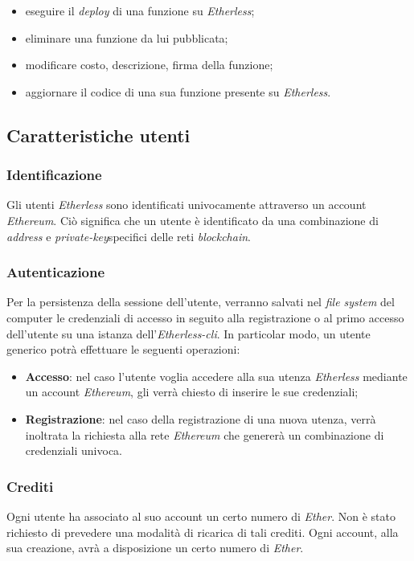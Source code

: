 \begin{itemize}
	\item eseguire il \textit{deploy\glo} di una funzione su \textit{Etherless};
	\item eliminare una funzione da lui pubblicata;
	\item modificare costo, descrizione, firma della funzione;
	\item aggiornare il codice di una sua funzione presente su \textit{Etherless}.
\end{itemize}



\subsection{Caratteristiche utenti}

\subsubsection{Identificazione}
Gli utenti \textit{Etherless} sono identificati univocamente attraverso un account \textit{Ethereum\glos}. Ciò significa che un utente è identificato da una combinazione di \textit{address} e \textit{private-key}\glo specifici delle reti \textit{blockchain\glos}.

\subsubsection{Autenticazione}
Per la persistenza della sessione dell'utente, verranno salvati nel \textit{file system\glo} del computer le credenziali di accesso in seguito alla registrazione o al primo accesso dell'utente su una istanza dell'\textit{Etherless-cli}. In particolar modo, un utente generico potrà effettuare le seguenti operazioni:
\begin{itemize}
	\item \textbf{Accesso}: nel caso l'utente voglia accedere alla sua utenza \textit{Etherless} mediante un account \textit{Ethereum\glos}, gli verrà chiesto di inserire le sue credenziali;
	\item \textbf{Registrazione}: nel caso della registrazione di una nuova utenza, verrà inoltrata la richiesta alla rete \textit{Ethereum\glo} che genererà un combinazione di credenziali univoca.
\end{itemize}
\subsubsection{Crediti}
Ogni utente ha associato al suo account un certo numero di \textit{Ether\glos}. Non è stato richiesto di prevedere una modalità di ricarica di tali crediti. Ogni account, alla sua creazione, avrà a disposizione un certo numero di \textit{Ether\glos}.

